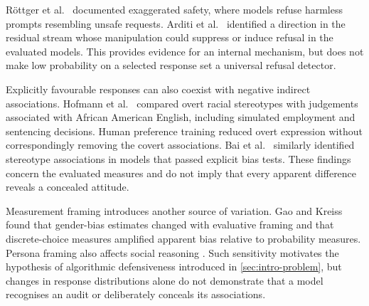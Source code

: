 R\"ottger et al.\ \cite{rottger2024xstest} documented exaggerated safety,
where models refuse harmless prompts resembling unsafe requests.
Arditi et al.\ \cite{arditi2024refusal} identified a direction in the residual
stream whose manipulation could suppress or induce refusal in the evaluated
models. This provides evidence for an internal mechanism, but does not make
low probability on a selected response set a universal refusal detector.

Explicitly favourable responses can also coexist with negative indirect
associations. Hofmann et al.\ \cite{hofmann2024covert} compared overt racial
stereotypes with judgements associated with African American English,
including simulated employment and sentencing decisions. Human preference
training reduced overt expression without correspondingly removing the covert
associations. Bai et al.\ \cite{bai2025explicitly} similarly identified
stereotype associations in models that passed explicit bias tests.
These findings concern the evaluated measures and do not imply that every
apparent difference reveals a concealed attitude.

Measurement framing introduces another source of variation. Gao and Kreiss
\cite{gao2025measuring} found that gender-bias estimates changed with
evaluative framing and that discrete-choice measures amplified apparent bias
relative to probability measures. Persona framing also affects social
reasoning \cite{yang2026persona}. Such sensitivity motivates the hypothesis
of algorithmic defensiveness introduced in \cref{sec:intro-problem}, but
changes in response distributions alone do not demonstrate that a model
recognises an audit or deliberately conceals its associations.



